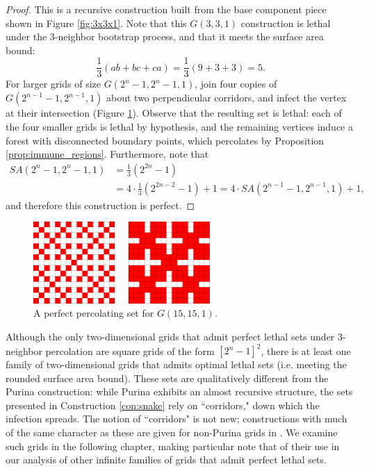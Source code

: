 \begin{proof}
This is a recursive construction built from the base component piece shown in Figure \ref{fig:3x3x1}. Note that this $G(3,3,1)$ construction is lethal under the 3-neighbor bootstrap process, and that it meets the surface area bound:
$$\frac{1}{3} (ab+bc+ca) = \frac{1}{3} (9 + 3 + 3) = 5.$$
For larger grids of size $G(2^n-1, 2^n-1, 1)$, join four copies of $G(2^{n-1}-1, 2^{n-1}, 1)$ about two perpendicular corridors, and infect the vertex at their intersection (Figure \ref{fig:15x15x1}). Observe that the resulting set is lethal: each of the four smaller grids is lethal by hypothesis, and the remaining vertices induce a forest with disconnected boundary points, which percolates by Proposition \ref{prop:immune_regions}. Furthermore, note that
\begin{align*}
SA(2^n-1,2^n-1,1) &= \frac{1}{3} (2^{2n}-1) \\
&= 4 \cdot \frac{1}{3} (2^{2n-2} -1) + 1 = 4 \cdot SA(2^{n-1}-1, 2^{n-1}, 1) + 1,
\end{align*}
and therefore this construction is perfect.
\end{proof}

\begin{figure}[]
\centering
\includegraphics[width=0.6\textwidth]{figures/7/15x15x1.pdf}
\caption{A perfect percolating set for $G(15,15,1)$.}
\label{fig:15x15x1}
\end{figure} 

Although the only two-dimensional grids that admit perfect lethal sets under 3-neighbor percolation are square grids of the form $[2^n-1]^2$, there is at least one family of two-dimensional grids that admits optimal lethal sets (i.e. meeting the rounded surface area bound). These sets are qualitatively different from the Purina construction: while Purina exhibits an almost recursive structure, the sets presented in Construction \ref{con:snake} rely on ``corridors," down which the infection spreads. The notion of ``corridors" is not new; constructions with much of the same character as these are given for non-Purina grids in \cite{benevides:2021}. We examine such grids in the following chapter, making particular note that of their use in our analysis of other infinite families of grids that admit perfect lethal sets. 


